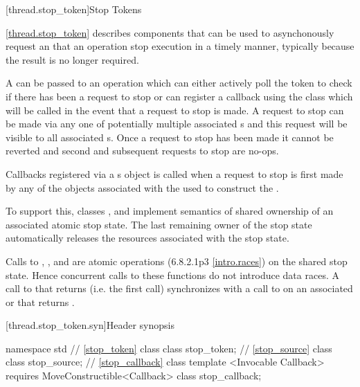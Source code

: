 {\color{insertcolor}

[thread.stop_token]{Stop Tokens}

\pnum
\ref{thread.stop_token} describes components that can be used to
asynchonously request an that an operation stop execution in a timely
manner, typically because the result is no longer required.

\pnum
A  can be passed to an operation which can either
actively poll the token to check if there has been a request to stop
or can register a callback using the  class which
will be called in the event that a request to stop is made. A request
to stop can be made via any one of potentially multiple associated
s and this request will be visible to all associated
s. Once a request to stop has been made it cannot be
reverted and second and subsequent requests to stop are no-ops.

\pnum
Callbacks registered via a s object is called when
a request to stop is first made by any of the  objects
associated with the  used to construct the .

\pnum
To support this, classes ,  and 
implement semantics of shared ownership of an associated atomic stop state.
The last remaining owner of the stop state automatically 
releases the resources associated with the stop state.

\pnum
Calls to , ,
and  are atomic operations (6.8.2.1p3 \ref{intro.races})
on the shared stop state.
Hence concurrent calls to these functions do not introduce data races. 
A call to  that returns  (i.e. the first call)
synchronizes with a call to  on an associated 
or  that returns .

[thread.stop_token.syn]{Header  synopsis}
%

\begin{codeblock}
namespace std {
  // \ref{stop_token} class 
  class stop_token;
  // \ref{stop_source} class 
  class stop_source;
  // \ref{stop_callback} class 
  template <Invocable Callback>
    requires MoveConstructible<Callback>
  class stop_callback;
}
\end{codeblock}


}
